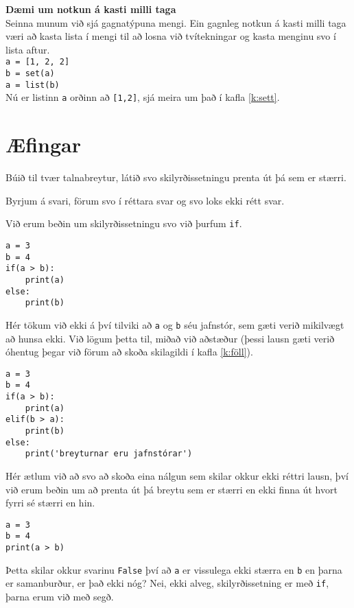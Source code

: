 \begin{itarefni}
\textbf{Dæmi um notkun á kasti milli taga}\\
Seinna munum við sjá gagnatýpuna mengi.
Ein gagnleg notkun á kasti milli taga væri að kasta lista í mengi til að losna við tvítekningar og kasta menginu svo í lista aftur.\\
\texttt{a = [1, 2, 2]}\\
\texttt{b = set(a)}\\
\texttt{a = list(b)}\\
Nú er listinn \texttt{a} orðinn að \texttt{[1,2]}, sjá meira um það í kafla \ref{k:sett}.
\end{itarefni}




\newpage
\section{Æfingar}
\begin{exercise}\label{exp1}
Búið til tvær talnabreytur, látið svo skilyrðissetningu prenta út þá sem er stærri.
\end{exercise}
\begin{Answer}[ref={exp1}]
Byrjum á svari, förum svo í réttara svar og svo loks ekki rétt svar.

Við erum beðin um skilyrðissetningu svo við þurfum \texttt{if}.
\begin{lstlisting}
a = 3
b = 4
if(a > b):
	print(a)
else:
	print(b)\end{lstlisting}

Hér tökum við ekki á því tilviki að \texttt{a} og \texttt{b} séu jafnstór, sem gæti verið mikilvægt að hunsa ekki.
Við lögum þetta til, miðað við aðstæður (þessi lausn gæti verið óhentug þegar við förum að skoða skilagildi í kafla \ref{k:föll}).
\begin{lstlisting}
a = 3
b = 4
if(a > b):
	print(a)
elif(b > a):
	print(b)
else:
	print('breyturnar eru jafnstórar')\end{lstlisting}

	
Hér ætlum við að svo að skoða eina nálgun sem skilar okkur ekki réttri lausn, því við erum beðin um að prenta út þá breytu sem er stærri en ekki finna út hvort fyrri sé stærri en hin.
\begin{lstlisting}
a = 3
b = 4
print(a > b)\end{lstlisting}
Þetta skilar okkur svarinu \texttt{False} því að \texttt{a} er vissulega ekki stærra en \texttt{b} en þarna er samanburður, er það ekki nóg?
Nei, ekki alveg, skilyrðissetning er með \texttt{if}, þarna erum við með segð.
\end{Answer}

